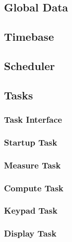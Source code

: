 \documentclass[12pt]{article} %
\begin{document}
    \subsection{Global Data}
    
    

    \subsection{Timebase}
    

    \subsection{Scheduler}
    
    

    \subsection{Tasks}
    \subsubsection{Task Interface}
    

    \subsubsection{Startup Task}
    
    

    \subsubsection{Measure Task}
    
    

    \subsubsection{Compute Task}
    
    

    \subsubsection{Keypad Task}
    
    

    \subsubsection{Display Task}
    
    
\end{document}
